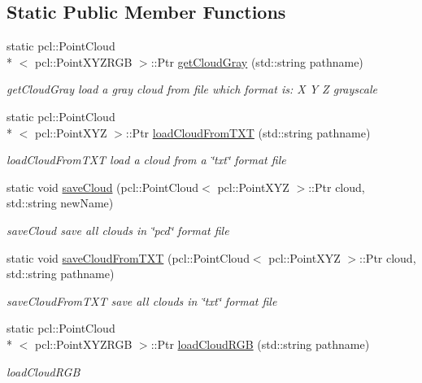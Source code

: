\subsection*{Static Public Member Functions}
\begin{DoxyCompactItemize}
\item 
static pcl\-::\-Point\-Cloud\\*
$<$ pcl\-::\-Point\-X\-Y\-Z\-R\-G\-B $>$\-::Ptr \hyperlink{classToolsPCL_ad7cc79166abda2af6583a6e6033ac003}{get\-Cloud\-Gray} (std\-::string pathname)
\begin{DoxyCompactList}\small\item\em get\-Cloud\-Gray load a gray cloud from file which format is\-: X Y Z grayscale \end{DoxyCompactList}\item 
static pcl\-::\-Point\-Cloud\\*
$<$ pcl\-::\-Point\-X\-Y\-Z $>$\-::Ptr \hyperlink{classToolsPCL_a99f419d563640af3422e5b964d7f9220}{load\-Cloud\-From\-T\-X\-T} (std\-::string pathname)
\begin{DoxyCompactList}\small\item\em load\-Cloud\-From\-T\-X\-T load a cloud from a \char`\"{}txt\char`\"{} format file \end{DoxyCompactList}\item 
static void \hyperlink{classToolsPCL_a247180362526813879137c9dda16d1dc}{save\-Cloud} (pcl\-::\-Point\-Cloud$<$ pcl\-::\-Point\-X\-Y\-Z $>$\-::Ptr cloud, std\-::string new\-Name)
\begin{DoxyCompactList}\small\item\em save\-Cloud save all clouds in \char`\"{}pcd\char`\"{} format file \end{DoxyCompactList}\item 
static void \hyperlink{classToolsPCL_a86b4d1d3f38ebfa68eba60c67f8ec0f6}{save\-Cloud\-From\-T\-X\-T} (pcl\-::\-Point\-Cloud$<$ pcl\-::\-Point\-X\-Y\-Z $>$\-::Ptr cloud, std\-::string pathname)
\begin{DoxyCompactList}\small\item\em save\-Cloud\-From\-T\-X\-T save all clouds in \char`\"{}txt\char`\"{} format file \end{DoxyCompactList}\item 
static pcl\-::\-Point\-Cloud\\*
$<$ pcl\-::\-Point\-X\-Y\-Z\-R\-G\-B $>$\-::Ptr \hyperlink{classToolsPCL_a787a46c37f74aa83e51e7aafdb009b51}{load\-Cloud\-R\-G\-B} (std\-::string pathname)
\begin{DoxyCompactList}\small\item\em load\-Cloud\-R\-G\-B \end{DoxyCompactList}\item 

\end{DoxyCompactItemize}
